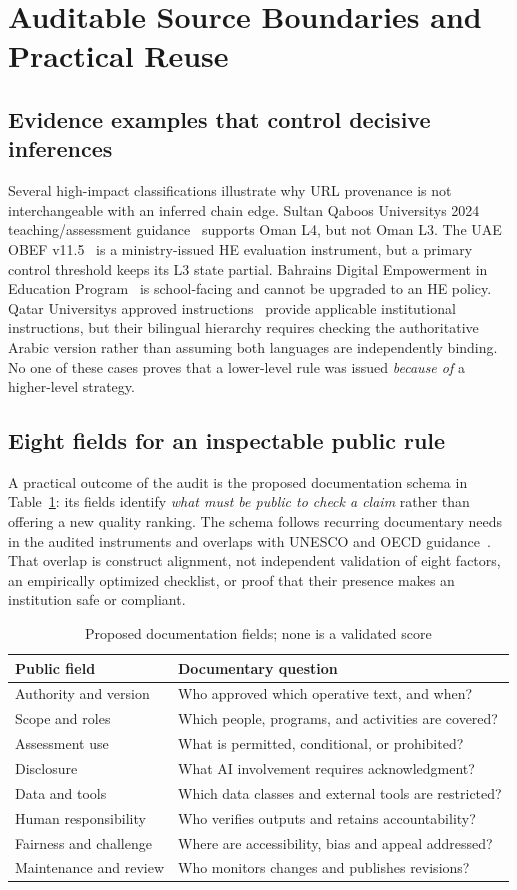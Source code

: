 \documentclass[conference,letterpaper]{IEEEtran}
\begin{document}


\section{Auditable Source Boundaries and Practical Reuse}
\subsection{Evidence examples that control decisive inferences}
Several high-impact classifications illustrate why URL provenance is not interchangeable with an inferred chain edge. Sultan Qaboos University\textquotesingle s 2024 teaching/assessment guidance~\cite{squ} supports Oman L4, but not Oman L3. The UAE OBEF v11.5~\cite{obef} is a ministry-issued HE evaluation instrument, but a primary control threshold keeps its L3 state partial. Bahrain\textquotesingle s Digital Empowerment in Education Program~\cite{bahrain} is school-facing and cannot be upgraded to an HE policy. Qatar University\textquotesingle s approved instructions~\cite{qataru} provide applicable institutional instructions, but their bilingual hierarchy requires checking the authoritative Arabic version rather than assuming both languages are independently binding. No one of these cases proves that a lower-level rule was issued \emph{because of} a higher-level strategy.

\subsection{Eight fields for an inspectable public rule}
A practical outcome of the audit is the proposed documentation schema in Table~\ref{tab:eight}: its fields identify \emph{what must be public to check a claim} rather than offering a new quality ranking. The schema follows recurring documentary needs in the audited instruments and overlaps with UNESCO and OECD guidance~\cite{unesco,oecd}. That overlap is construct alignment, not independent validation of eight factors, an empirically optimized checklist, or proof that their presence makes an institution safe or compliant.

\begin{table}[t]
\centering\caption{Proposed documentation fields; none is a validated score}\label{tab:eight}
\footnotesize
\begin{tabularx}{\columnwidth}{@{}p{}X@{}}
\toprule
Public field & Documentary question\tabularnewline\midrule
Authority and version & Who approved which operative text, and when?\tabularnewline
Scope and roles & Which people, programs, and activities are covered?\tabularnewline
Assessment use & What is permitted, conditional, or prohibited?\tabularnewline
Disclosure & What AI involvement requires acknowledgment?\tabularnewline
Data and tools & Which data classes and external tools are restricted?\tabularnewline
Human responsibility & Who verifies outputs and retains accountability?\tabularnewline
Fairness and challenge & Where are accessibility, bias and appeal addressed?\tabularnewline
Maintenance and review & Who monitors changes and publishes revisions?\tabularnewline
\bottomrule
\end{tabularx}
\end{table}
\end{document}
